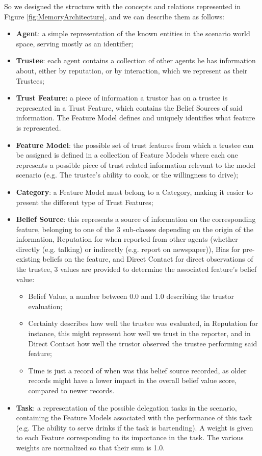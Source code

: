 So we designed the structure with the concepts and relations represented in Figure \ref{fig:MemoryArchitecture}, and we can describe them as follows:

\begin{itemize}
    \item \textbf{Agent}: a simple representation of the known entities in the scenario world space, serving mostly as an identifier;
    \item \textbf{Trustee}: each agent contains a collection of other agents he has information about,  either by reputation, or by interaction, which we represent as their Trustees;
    \item \textbf{Trust Feature}: a piece of information a trustor has on a trustee is represented in a Trust Feature, which contains the Belief Sources of said information. The Feature Model defines and uniquely identifies what feature is represented.
    \item \textbf{Feature Model}: the possible set of trust features from which a trustee can be assigned is defined in a collection of Feature Models where each one represents a possible piece of trust related information relevant to the model scenario (e.g. The trustee's ability to cook, or the willingness to drive);
    \item \textbf{Category}: a Feature Model must belong to a Category, making it easier to present the different type of Trust Features;
    \item \textbf{Belief Source}: this represents a source of information on the corresponding feature, belonging to one of the 3 sub-classes depending on the origin of the information, Reputation for when reported from other agents (whether directly (e.g. talking) or indirectly (e.g. report on newspaper)), Bias for pre-existing beliefs on the feature, and Direct Contact for direct observations of the trustee, 3 values are provided to determine the associated feature's belief value: 
        \begin{itemize}
            \item Belief Value, a number between 0.0 and 1.0 describing the trustor evaluation;
            \item Certainty describes how well the trustee was evaluated, in Reputation for instance, this might represent how well we trust in the reporter, and in Direct Contact how well the trustor observed the trustee performing said feature;
            \item Time is just a record of when was this belief source recorded, as older records might have a lower impact in the overall belief value score, compared to newer records.
        \end{itemize} 
    \item \textbf{Task}: a representation of the possible delegation tasks in the scenario, containing the Feature Models associated with the performance of this task (e.g. The ability to serve drinks if the task is bartending). A weight is given to each Feature corresponding to its importance in the task. The various weights are normalized so that their sum is 1.0.
\end{itemize} 

